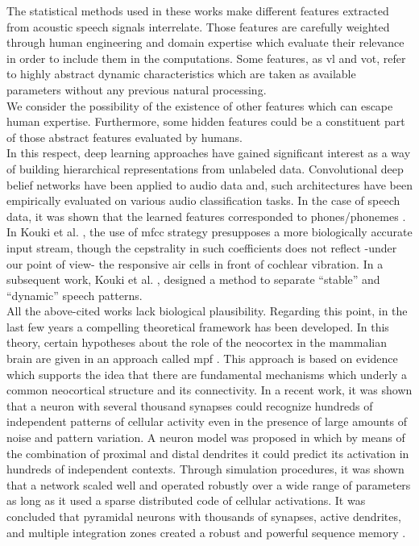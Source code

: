 \documentclass[11pt,a4paper]{article}
\begin{document}
The statistical methods used in these works make
different features extracted from acoustic speech signals
interrelate.
Those features are carefully weighted
through human engineering and domain expertise
which evaluate their relevance in order to include them
in the computations.
Some features, as \gls{vl} and \gls{vot},
refer to highly abstract dynamic characteristics
which are taken
as available parameters without any previous natural
processing.\\

We consider the possibility of the existence of other
features which can escape human expertise.
Furthermore, some hidden features could be a constituent
part of those abstract features evaluated by humans. \\

In this respect, deep learning approaches have gained significant interest as a
way of building hierarchical representations from unlabeled data.
Convolutional deep belief networks have been applied to audio data and,
such architectures have been empirically evaluated on various audio classification
tasks. In the case of speech data, it was shown that the learned features corresponded
to phones/phonemes \cite{Lee:2009:UFL:2984093.2984217}. \\

In Kouki et al. \cite{kouki_2010},
the use of \gls{mfcc}
strategy presupposes a more biologically accurate input stream,
though the cepstrality in such coefficients does not reflect
-under our point of view-
the responsive air cells in front of cochlear vibration.
In a subsequent work, Kouki et al. \cite{kouki_2011},
designed a method to separate “stable” and “dynamic” speech
patterns. \\

All the above-cited works lack biological plausibility.
Regarding this point, in the last few years a compelling
theoretical framework has been developed.
In this theory, certain hypotheses about the role of
the neocortex in the mammalian brain are given in an
approach called \gls{mpf}
\cite{hawkins_2004}.
This approach is based on evidence
which supports the idea that there are fundamental
mechanisms which underly a common neocortical
structure and its connectivity.
In a recent work, it was shown that a neuron with
several thousand synapses could recognize hundreds
of independent patterns of cellular activity even
in the presence of large amounts of
noise and pattern variation.
A neuron model was proposed in which by means of
the combination of proximal and distal dendrites
it could predict its activation in hundreds of independent contexts.
Through simulation procedures, it was shown that a network
scaled well and operated robustly over a wide range of parameters as long as it
used a sparse distributed code of cellular activations.
It was concluded that pyramidal neurons with thousands of
synapses, active dendrites, and multiple integration zones
created a robust and powerful
sequence memory \cite{hawkins_2016}. \\
\end{document}
